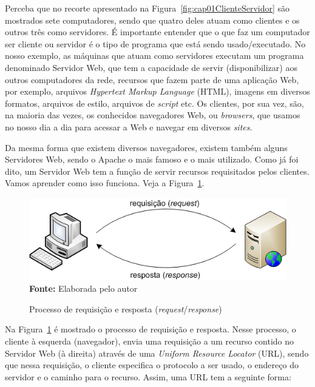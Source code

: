 Perceba que no recorte apresentado na Figura~\ref{fig:cap01ClienteServidor} são mostrados sete computadores, sendo que quatro deles atuam como clientes e os outros três como servidores. É importante entender que o que faz um computador ser cliente ou servidor é o tipo de programa que está sendo usado/executado. No nosso exemplo, as máquinas que atuam como servidores executam um programa denominado Servidor Web, que tem a capacidade de servir (disponibilizar) aos outros computadores da rede, recursos que fazem parte de uma aplicação Web, por exemplo, arquivos \textit{Hypertext Markup Language} (HTML), imagens em diversos formatos, arquivos de estilo, arquivos de \textit{script} etc. Os clientes, por sua vez, são, na maioria das vezes, os conhecidos navegadores Web, ou \textit{browsers}, que usamos no nosso dia a dia para acessar a Web e navegar em diversos \textit{sites}.

Da mesma forma que existem diversos navegadores, existem também alguns Servidores Web, sendo o Apache o mais famoso e o mais utilizado. Como já foi dito, um Servidor Web tem a função de servir recursos requisitados pelos clientes. Vamos aprender como isso funciona. Veja a Figura~\ref{fig:cap01RequestResponse}.

\FloatBarrier
\begin{figure}[!htbp]
    \centering
    \caption{Processo de requisição e resposta (\textit{request}/\textit{response})}
    \includegraphics[scale=0.6]{imagens/cap01RequestResponse}
    \\\textbf{Fonte:} Elaborada pelo autor
    \label{fig:cap01RequestResponse}
\end{figure}
\FloatBarrier

Na Figura~\ref{fig:cap01RequestResponse} é mostrado o processo de requisição e resposta. Nesse processo, o cliente à esquerda (navegador), envia uma requisição a um recurso contido no Servidor Web (à direita) através de uma \textit{Uniform Resource Locator} (URL), sendo que nessa requisição, o cliente especifica o protocolo a ser usado, o endereço do servidor e o caminho para o recurso. Assim, uma URL tem a seguinte forma:

